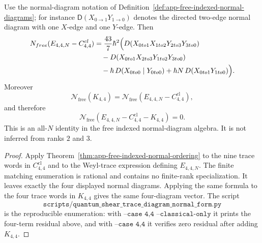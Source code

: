 \begin{prop}
\label{prop:app-free-trace-diagram-K44}
  Use the normal-diagram notation of
  Definition~\ref{def:app-free-indexed-normal-diagrams}; for instance
  \(\mathsf D(X_{0\to1}Y_{1\to0})\) denotes the directed two-edge
  normal diagram with one \(X\)-edge and one \(Y\)-edge.  Then
  \[
  \begin{aligned}
    \mathcal N_{\mathrm{free}}
      (E_{4,4,N}-C^{\mathrm{cl}}_{4,4})
    &=
      \frac{43}{7}\hbar^2\Bigl(
      \mathsf D(X_{0\to1}X_{1\to2}Y_{2\to3}Y_{3\to0})\\
    &\quad
      -\mathsf D(X_{0\to1}X_{2\to3}Y_{1\to2}Y_{3\to0})\\
    &\quad
      -\hbar\,\mathsf D(X_{0\to0}\mid Y_{0\to0})
      +\hbar N\,\mathsf D(X_{0\to1}Y_{1\to0})
      \Bigr).
  \end{aligned}
  \]
  Moreover
  \[
    \mathcal N_{\mathrm{free}}(K_{4,4})
    =
    \mathcal N_{\mathrm{free}}
      (E_{4,4,N}-C^{\mathrm{cl}}_{4,4}),
  \]
  and therefore
  \[
    \mathcal N_{\mathrm{free}}
      (E_{4,4,N}-C^{\mathrm{cl}}_{4,4}-K_{4,4})=0.
  \]
  This is an all-\(N\) identity in the free indexed normal-diagram
  algebra.  It is not inferred from ranks \(2\) and \(3\).
\end{prop}

\begin{proof}
  Apply Theorem~\ref{thm:app-free-indexed-normal-ordering} to the nine
  trace words in \(C^{\mathrm{cl}}_{4,4}\) and to the Weyl-trace
  expression defining \(E_{4,4,N}\).  The finite matching enumeration is
  rational and contains no finite-rank specialization.  It leaves exactly
  the four displayed normal diagrams.  Applying the same formula to the
  four trace words in \(K_{4,4}\) gives the same four-diagram vector.
  The script
  \[
    \texttt{scripts/quantum\_shear\_trace\_diagram\_normal\_form.py}
  \]
  is the reproducible enumeration: with
  \(\texttt{--case 4,4 --classical-only}\) it prints the four-term
  residual above, and with \(\texttt{--case 4,4}\) it verifies zero
  residual after adding \(K_{4,4}\).
\end{proof}

